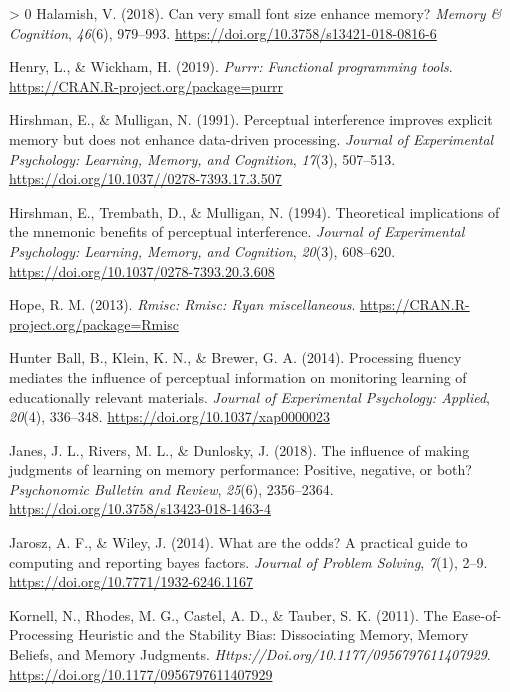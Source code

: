 \documentclass[
  english,
  jou]{apa7}
\newlength{\cslhangindent}
\newenvironment{CSLReferences}[3] %
 {%
  \setlength{\parindent}{0pt}
  \ifodd #1 \everypar{\setlength{\hangindent}{\cslhangindent}}\ignorespaces\fi
  \ifnum #2 > 0
  \setlength{\parskip}{#2\baselineskip}
  \fi
 }%
 {}
\begin{document}
\begin{CSLReferences}{1}{0}
\leavevmode\hypertarget{ref-Halamish2018}{}%
Halamish, V. (2018). {Can very small font size enhance memory?} \emph{Memory {\&} Cognition}, \emph{46}(6), 979--993. \url{https://doi.org/10.3758/s13421-018-0816-6}

\leavevmode\hypertarget{ref-R-purrr}{}%
Henry, L., \& Wickham, H. (2019). \emph{Purrr: Functional programming tools}. \url{https://CRAN.R-project.org/package=purrr}

\leavevmode\hypertarget{ref-Hirshman1991}{}%
Hirshman, E., \& Mulligan, N. (1991). {Perceptual interference improves explicit memory but does not enhance data-driven processing.} \emph{Journal of Experimental Psychology: Learning, Memory, and Cognition}, \emph{17}(3), 507--513. \url{https://doi.org/10.1037//0278-7393.17.3.507}

\leavevmode\hypertarget{ref-Hirshman1994}{}%
Hirshman, E., Trembath, D., \& Mulligan, N. (1994). {Theoretical implications of the mnemonic benefits of perceptual interference.} \emph{Journal of Experimental Psychology: Learning, Memory, and Cognition}, \emph{20}(3), 608--620. \url{https://doi.org/10.1037/0278-7393.20.3.608}

\leavevmode\hypertarget{ref-R-Rmisc}{}%
Hope, R. M. (2013). \emph{Rmisc: Rmisc: Ryan miscellaneous}. \url{https://CRAN.R-project.org/package=Rmisc}

\leavevmode\hypertarget{ref-HunterBall2014}{}%
Hunter Ball, B., Klein, K. N., \& Brewer, G. A. (2014). {Processing fluency mediates the influence of perceptual information on monitoring learning of educationally relevant materials}. \emph{Journal of Experimental Psychology: Applied}, \emph{20}(4), 336--348. \url{https://doi.org/10.1037/xap0000023}

\leavevmode\hypertarget{ref-Janes2018}{}%
Janes, J. L., Rivers, M. L., \& Dunlosky, J. (2018). {The influence of making judgments of learning on memory performance: Positive, negative, or both?} \emph{Psychonomic Bulletin and Review}, \emph{25}(6), 2356--2364. \url{https://doi.org/10.3758/s13423-018-1463-4}

\leavevmode\hypertarget{ref-Jarosz2014}{}%
Jarosz, A. F., \& Wiley, J. (2014). {What are the odds? A practical guide to computing and reporting bayes factors}. \emph{Journal of Problem Solving}, \emph{7}(1), 2--9. \url{https://doi.org/10.7771/1932-6246.1167}

\leavevmode\hypertarget{ref-Kornell2011}{}%
Kornell, N., Rhodes, M. G., Castel, A. D., \& Tauber, S. K. (2011). {The Ease-of-Processing Heuristic and the Stability Bias: Dissociating Memory, Memory Beliefs, and Memory Judgments}. \emph{Https://Doi.org/10.1177/0956797611407929}. \url{https://doi.org/10.1177/0956797611407929}


\end{CSLReferences}
\end{document}
